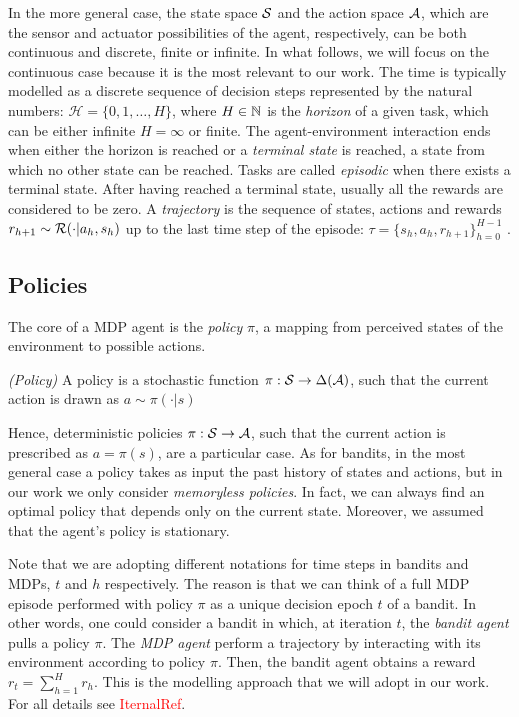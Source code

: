 In the more general case, the state space $\mathcal{S}$ and the action space $\mathcal{A}$, which are the sensor and actuator possibilities of the agent, respectively, can be both continuous and discrete, finite or infinite. In what follows, we will focus on the continuous case because it is the most relevant to our work. The time is typically modelled as a discrete sequence of decision steps represented by the natural numbers: $\mathcal{H} = \{0, 1, \dots, H\}$, where $H\in\mathbb{N}$ is the \emph{horizon} of a given task, which can be either infinite $H = \infty$ or finite. The agent-environment interaction ends when either the horizon is reached or a \emph{terminal state} is reached, \ie a state from which no other state can be reached. Tasks are called \emph{episodic} when there exists a terminal state. After having reached a terminal state, usually all the rewards are considered to be zero. A \emph{trajectory} is the sequence of states, actions and rewards $r_{h+1}\sim\mathcal{R}(\cdot|a_h, s_h)$ up to the last time step of the episode: $\tau=\{s_h,a_h,r_{h+1}\}_{h=0}^{H-1}$ . \\

\subsection{Policies}
The core of a \gls{MDP} agent is the \emph{policy} $\pi$, a mapping from perceived states of the environment to possible actions. 

\begin{definition} \emph{(Policy)}
A policy is a stochastic function $\pi:\mathcal{S}\to\Delta(\mathcal{A})$, such that the current action is drawn as $a\sim\pi(\cdot|s)$
\end{definition}

Hence, deterministic policies $\pi:\mathcal{S}\to\mathcal{A}$, such that the current action is prescribed as $a=\pi(s)$, are a particular case. As for bandits, in the most general case a policy takes as input the past history of states and actions, but in our work we only consider \emph{memoryless policies}. In fact, we can always find an optimal policy that depends only on the current state. Moreover, we assumed that the agent's policy is stationary.

\begin{remark}
Note that we are adopting different notations for time steps in bandits and \gls{MDP}s, $t$ and $h$ respectively. The reason is that we can think of a full \gls{MDP} episode  performed with policy $\pi$ as a unique decision epoch $t$ of a bandit. In other words, one could consider a bandit in which, at iteration $t$, the \emph{bandit agent} pulls a policy $\pi$. The \emph{\gls{MDP} agent} perform a trajectory by interacting with its environment according to policy $\pi$. Then, the bandit agent obtains a reward $r_t=\sum_{h=1}^{H}r_h$. This is the modelling approach that we will adopt in our work. For all details see \textcolor{red}{IternalRef}.
\end{remark}

